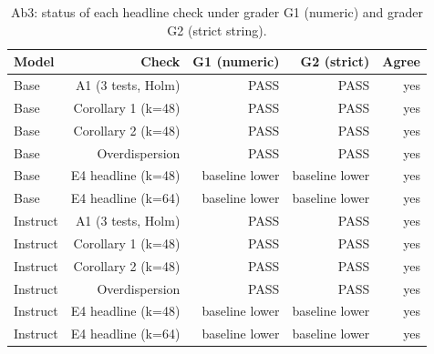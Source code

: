 \begin{table}[t]
\centering
\small
\begin{tabular}{lrrrr}
\toprule
Model & Check & G1 (numeric) & G2 (strict) & Agree \\
\midrule
Base & A1 (3 tests, Holm) & PASS & PASS & yes \\
Base & Corollary 1 (k=48) & PASS & PASS & yes \\
Base & Corollary 2 (k=48) & PASS & PASS & yes \\
Base & Overdispersion & PASS & PASS & yes \\
Base & E4 headline (k=48) & baseline lower & baseline lower & yes \\
Base & E4 headline (k=64) & baseline lower & baseline lower & yes \\
Instruct & A1 (3 tests, Holm) & PASS & PASS & yes \\
Instruct & Corollary 1 (k=48) & PASS & PASS & yes \\
Instruct & Corollary 2 (k=48) & PASS & PASS & yes \\
Instruct & Overdispersion & PASS & PASS & yes \\
Instruct & E4 headline (k=48) & baseline lower & baseline lower & yes \\
Instruct & E4 headline (k=64) & baseline lower & baseline lower & yes \\
\bottomrule
\end{tabular}
\caption{Ab3: status of each headline check under grader G1 (numeric) and grader G2 (strict string).}
\label{tab:T7_verifier_ablation_G1_vs_G2}
\end{table}
